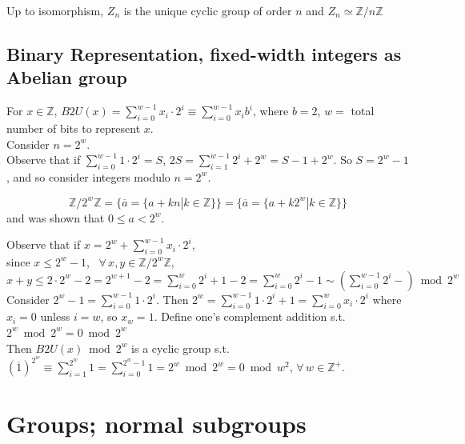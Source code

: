 \begin{theorem}\label{agat:Thm:CyclicGroupIntegerModuloNIsomorphic}
	Up to isomorphism, $Z_n$ is the unique cyclic group of order $n$ and $Z_n \simeq \mathbb{Z}/ n\mathbb{Z}$
\end{theorem}

\subsection{Binary Representation, fixed-width integers as Abelian group}

For $x\in \mathbb{Z}$, $B2U(x) = \sum_{i=0}^{w-1} x_i \cdot 2^i \equiv \sum_{i=0}^{w-1} x_i b^i$, where $b=2$, $w= $ total number of bits to represent $x$. \\

Consider $n=2^w$. \\

Observe that if $\sum_{i=0}^{w-1} 1 \cdot 2^i = S$, $2S = \sum_{i=1}^{w-1} 2^i + 2^w = S - 1  + 2^w$. So $S = 2^w-1$, and so consider integers modulo $n=2^w$. 

\[
\mathbb{Z} / 2^w \mathbb{Z} = \lbrace \overline{a} = \lbrace a + kn | k \in \mathbb{Z} \rbrace \rbrace = \lbrace \overline{a} = \lbrace a + k 2^w | k \in \mathbb{Z} \rbrace \rbrace
\]
and was shown that $0\leq a < 2^w$.

Observe that if $x=  2^w + \sum_{i=0}^{w-1} x_i \cdot 2^i$, \\

since $x \leq 2^w - 1$, \, $\forall \, x,y \in \mathbb{Z} / 2^w \mathbb{Z}$, $x+y\leq 2 \cdot 2^w - 2 = 2^{w+1} - 2 = \sum_{i=0}^w 2^i + 1 - 2 = \sum_{i=0}^w 2^i - 1 \sim \left( \sum_{i=0}^{w-1} 2^i - \right) \bmod{2^w}$ \\


Consider $2^w - 1 = \sum_{i=0}^{w-1} 1 \cdot 2^i$. Then $2^w = \sum_{i=0}^{w-1} 1 \cdot 2^i + 1  = \sum_{i=0}^w x_i \cdot 2^i$ where $x_i = 0$ unless $i=w$, so $x_w = 1$. Define one's complement addition s.t. $2^w \bmod{2^w} = 0 \bmod 2^w$ \\

Then $B2U(x) \bmod{2^w}$ is a cyclic group s.t. $(\overline{1})^{2^w} \equiv \sum_{i=1}^{2^w} 1 = \sum_{i=0}^{2^w -1} 1 = 2^w \bmod{2^w} = 0 \bmod{w^2}$, $\forall \, w \in \mathbb{Z}^+$.

\section{Groups; normal subgroups}  

